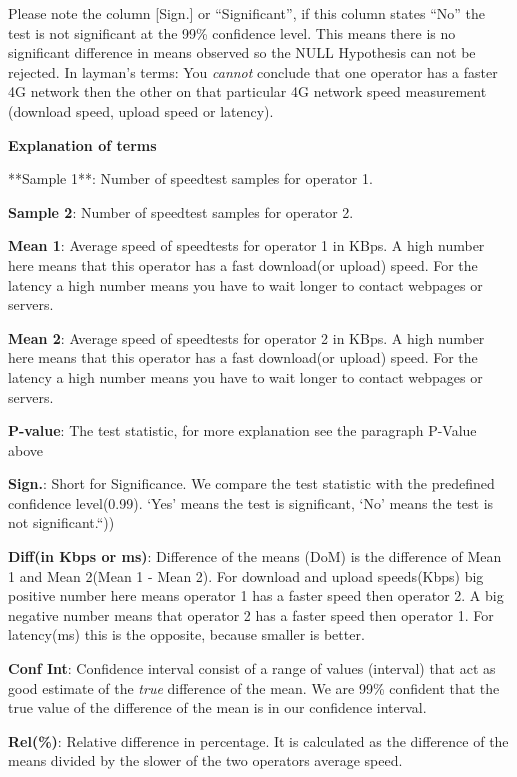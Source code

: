 \documentclass[]{article}
\begin{document}
Please note the column {[}Sign.{]} or ``Significant'', if this column
states ``No'' the test is not significant at the 99\% confidence level.
This means there is no significant difference in means observed so the
NULL Hypothesis can not be rejected. In layman's terms: You
\emph{cannot} conclude that one operator has a faster 4G network then
the other on that particular 4G network speed measurement (download
speed, upload speed or latency).

\textbf{Explanation of terms}

\footnotesize
**Sample 1**: Number of speedtest samples for operator 1.

\textbf{Sample 2}: Number of speedtest samples for operator 2.

\textbf{Mean 1}: Average speed of speedtests for operator 1 in KBps. A
high number here means that this operator has a fast download(or upload)
speed. For the latency a high number means you have to wait longer to
contact webpages or servers.

\textbf{Mean 2}: Average speed of speedtests for operator 2 in KBps. A
high number here means that this operator has a fast download(or upload)
speed. For the latency a high number means you have to wait longer to
contact webpages or servers.

\textbf{P-value}: The test statistic, for more explanation see the
paragraph P-Value above

\textbf{Sign.}: Short for Significance. We compare the test statistic
with the predefined confidence level(0.99). `Yes' means the test is
significant, `No' means the test is not significant.``))

\textbf{Diff(in Kbps or ms)}: Difference of the means (DoM) is the
difference of Mean 1 and Mean 2(Mean 1 - Mean 2). For download and
upload speeds(Kbps) big positive number here means operator 1 has a
faster speed then operator 2. A big negative number means that operator
2 has a faster speed then operator 1. For latency(ms) this is the
opposite, because smaller is better.

\textbf{Conf Int}: Confidence interval consist of a range of values
(interval) that act as good estimate of the \emph{true} difference of
the mean. We are 99\% confident that the true value of the difference of
the mean is in our confidence interval.

\textbf{Rel(\%)}: Relative difference in percentage. It is calculated as
the difference of the means divided by the slower of the two operators
average speed.
\end{document}
